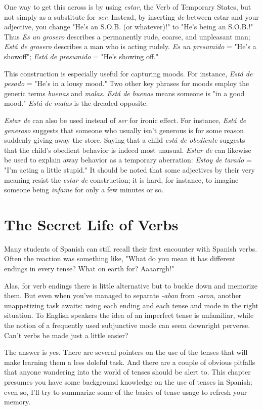 \documentclass[14pt,a4paper,oneside]{memoir}
\begin{document}
One way to get this across is by using \emph{estar}, the Verb of Temporary States, but not simply as a substitute for \emph{ser}. Instead, by inserting \emph{de} between estar and your adjective, you change "He's an S.O.B.
(or whatever)!" to "He's being an S.O.B.!" Thus \emph{Es un grosero} describes
a permanently rude, coarse, and unpleasant man; \emph{Está de grosero} describes a man who is acting rudely. \emph{Es un presumido} = "He's a showoff"; \emph{Está de presumido} = "He's showing off."

This construction is especially useful for capturing moods. For
instance, \emph{Está de pesado} = "He's in a lousy mood." Two other key
phrases for moods employ the generic terms \emph{buenas} and \emph{malas}. \emph{Está
de buenas} means someone is "in a good mood." \emph{Está de malas} is the
dreaded opposite.

\emph{Estar de} can also be used instead of \emph{ser} for ironic effect. For
instance, \emph{Está de generoso} suggests that someone who usually isn't
generous is for some reason suddenly giving away the store. Saying
that a child \emph{está de obediente} suggests that the child's obedient behavior is indeed most unusual. \emph{Estar de} can likewise be used to explain
away behavior as a temporary aberration: \emph{Estoy de tarado} = "I'm acting a little stupid." It should be noted that some adjectives by their
very meaning resist the \emph{estar de} construction; it is hard, for instance,
to imagine someone being \emph{infame} for only a few minutes or so.

\chapter{The Secret Life of Verbs}

Many students of Spanish can still recall their first encounter
with Spanish verbs. Often the reaction was something like, "What do
you mean it has different endings in every tense? What on earth for?
Aaaarrgh!"

Alas, for verb endings there is little alternative but to buckle
down and memorize them. But even when you've managed to separate
\emph{-aban} from \emph{-aron}, another unappetizing task awaits: using each ending
and each tense and mode in the right situation. To English speakers
the idea of an imperfect tense is unfamiliar, while the notion of a frequently used subjunctive mode can seem downright perverse. Can't
verbs be made just a little easier?

The answer is yes. There are several pointers on the use of the
tenses that will make learning them a less doleful task. And there are
a couple of obvious pitfalls that anyone wandering into the world of
tenses should be alert to. This chapter presumes you have some background knowledge on the use of tenses in Spanish; even so, I'll try to
summarize some of the basics of tense usage to refresh your memory.
\end{document}
